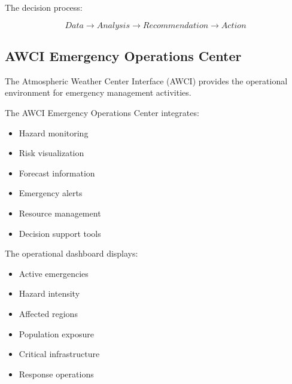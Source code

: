 The decision process:

\[
Data
\rightarrow
Analysis
\rightarrow
Recommendation
\rightarrow
Action
\]


\subsection{AWCI Emergency Operations Center}

The Atmospheric Weather Center Interface (AWCI) provides the operational
environment for emergency management activities.

The AWCI Emergency Operations Center integrates:

\begin{itemize}

\item Hazard monitoring

\item Risk visualization

\item Forecast information

\item Emergency alerts

\item Resource management

\item Decision support tools

\end{itemize}


The operational dashboard displays:

\begin{itemize}

\item Active emergencies

\item Hazard intensity

\item Affected regions

\item Population exposure

\item Critical infrastructure

\item Response operations

\end{itemize}



